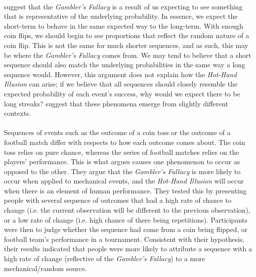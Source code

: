 \documentclass[12pt]{article}
\begin{document}
\paragraph{} \cite{KAHNEMAN1972430} suggest that the \textit{Gambler's Fallacy} is a result of us expecting to see something that is representative of the underlying probability. In essence, we expect the short-term to behave in the same expected way to the long-term. With enough coin flips, we should begin to see proportions that reflect the random nature of a coin flip. This is not the same for much shorter sequences, and as such, this may be where the \textit{Gambler's Fallacy} comes from. We may tend to believe that a short sequence should also match the underlying probabilities in the same way a long sequence would. However, this argument does not explain how the \textit{Hot-Hand Illusion} can arise; if we believe that all sequences should closely resemble the expected probability of each event's success, why would we expect there to be long streaks? \cite{Ayton2004} suggest that these phenomena emerge from slightly different contexts.

\paragraph{} Sequences of events such as the outcome of a coin toss or the outcome of a football match differ with respects to how each outcome comes about. The coin toss relies on pure chance, whereas the series of football matches relies on the players' performance. This is what \cite{Ayton2004} argues causes one phenomenon to occur as opposed to the other. They argue that the \textit{Gambler's Fallacy} is more likely to occur when applied to mechanical events, and the \textit{Hot-Hand Illusion} will occur when there is an element of human performance. They tested this by presenting people with several sequence of outcomes that had a high rate of chance to change (i.e. the current observation will be different to the previous observation), or a low rate of change (i.e. high chance of there being repetitions). Participants were then to judge whether the sequence had come from a coin being flipped, or football team's performance in a tournament. Consistent with their hypothesis, their results indicated that people were more likely to attribute a sequence with a high rate of change (reflective of the \textit{Gambler's Fallacy}) to a more mechanical/random source. 
\end{document}
